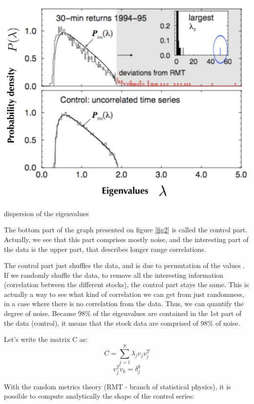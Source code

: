 \documentclass[a4paper]{tufte-book}
\begin{document}
\begin{marginfigure}
    \includegraphics{./Figures/eigenvaluesdisp.png}
    \caption{dispersion of the eigenvalues}
    \label{fig2}
\end{marginfigure}

The bottom part of the graph presented on figure \ref{fig2} is called the
control part. Actually, we see that this part comprises mostly noise, and the
interesting part of the data is the upper part, that describes longer range
correlations.

The control part just shuffles the data, and is due to permutation of the values
. If we randomly shuffle the data, to remove all the interesting information
(correlation between the different stocks), the control part stays the same.
This is actually a way to see what kind of correlation we can get from just
randomness, in a case where there is no correlation from the data.
Thus, we can quantify the degree of noise. Because 98\% of the eigenvalues are
contained in the 1st part of the data (control), it means that the stock data
are comprised of 98\% of noise.

Let's write the matrix C as:
\begin{equation}
    C = \sum_{j=1}^p \lambda_j v_j v_j^T
\end{equation} 
\begin{equation}
    v_j^T v_k = \delta_j^k
\end{equation}

With the random metrics theory (RMT - branch of statistical physics), it is
possible to compute analytically the shape of the control series:
\end{document}
